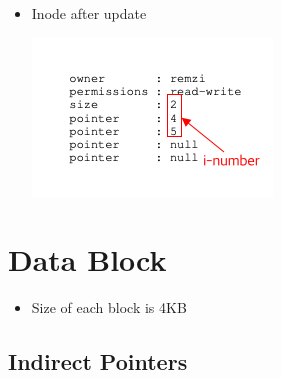 \documentclass[12pt]{article}
\begin{document}
\begin{itemize}
    \item Inode after update

    \begin{center}
    \includegraphics[width=0.6\linewidth]{../images/midterm_4_solution_27.png}
    \end{center}










\end{itemize}

\section{Data Block}

\begin{itemize}
    \item Size of each block is 4KB
\end{itemize}

\subsection{Indirect Pointers}
\end{document}
